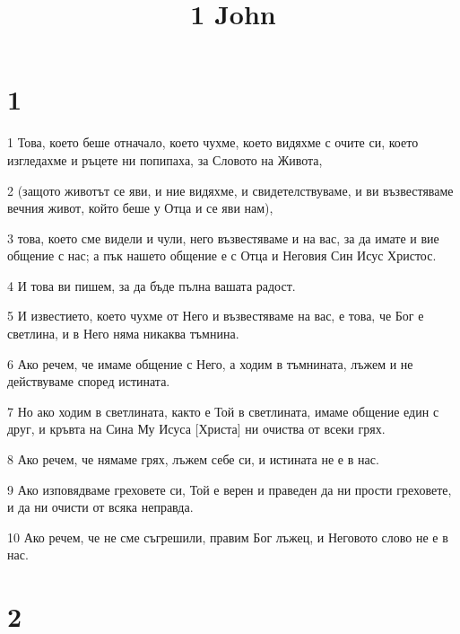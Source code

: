 

\title{1 John}


\chapter{1}

\par 1 Това, което беше отначало, което чухме, което видяхме с очите си, което изгледахме и ръцете ни попипаха, за Словото на Живота,
\par 2 (защото животът се яви, и ние видяхме, и свидетелствуваме, и ви възвестяваме вечния живот, който беше у Отца и се яви нам),
\par 3 това, което сме видели и чули, него възвестяваме и на вас, за да имате и вие общение с нас; а пък нашето общение е с Отца и Неговия Син Исус Христос.
\par 4 И това ви пишем, за да бъде пълна вашата радост.
\par 5 И известието, което чухме от Него и възвестяваме на вас, е това, че Бог е светлина, и в Него няма никаква тъмнина.
\par 6 Ако речем, че имаме общение с Него, а ходим в тъмнината, лъжем и не действуваме според истината.
\par 7 Но ако ходим в светлината, както е Той в светлината, имаме общение един с друг, и кръвта на Сина Му Исуса [Христа] ни очиства от всеки грях.
\par 8 Ако речем, че нямаме грях, лъжем себе си, и истината не е в нас.
\par 9 Ако изповядваме греховете си, Той е верен и праведен да ни прости греховете, и да ни очисти от всяка неправда.
\par 10 Ако речем, че не сме съгрешили, правим Бог лъжец, и Неговото слово не е в нас.

\chapter{2}

